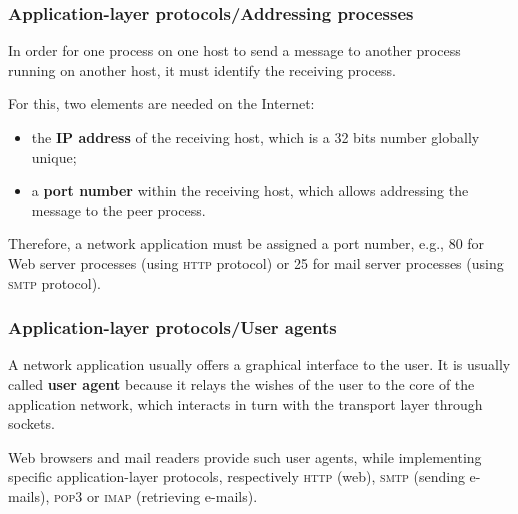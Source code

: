 %
\begin{frame}
\frametitle{Application-layer protocols/Addressing processes}

In order for one process on one host to send a message to another
process running on another host, it must identify the receiving
process.

\bigskip

For this, two elements are needed on the Internet:
\begin{itemize}

  \item the \textbf{IP address} of the receiving host, which is
  a 32 bits number globally unique;

  \item a \textbf{port number} within the receiving host, which
  allows addressing the message to the peer process.

\end{itemize}
Therefore, a network application must be assigned a port number,
e.g., 80 for Web server processes (using \textsc{http} protocol) or 25
for mail server processes (using \textsc{smtp} protocol).

\end{frame}

%
\begin{frame}
\frametitle{Application-layer protocols/User agents}

A network application usually offers a graphical interface to the
user. It is usually called \textbf{user agent} because it relays the
wishes of the user to the core of the application network, which
interacts in turn with the transport layer through sockets.

\bigskip

Web browsers and mail readers provide such user agents, while
implementing specific application-layer protocols, respectively
\textsc{http} (web), \textsc{smtp} (sending e-mails), \textsc{pop3} or
\textsc{imap} (retrieving e-mails).

\end{frame}

